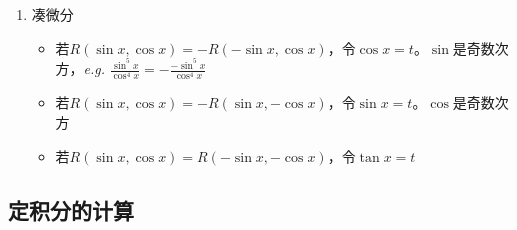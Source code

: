 \documentclass[../book.tex]{subfiles}
\begin{document}
\begin{enumerate}
\begin{enumerate}
\begin{analysisbox}
                又：
                \[
                    1+\cos x
                    =
                    2\cos^2\frac{x}{2}
                \]

                所以：
                \[
                    I
                    =
                    \frac1{2a}
                    \int\sec^2\frac{x}{2}\,\mathrm{d}x
                \]

                得：
                \[
                    I
                    =
                    \frac1a\tan\frac{x}{2}+C
                \]

                若：
                \[
                    a=-b
                \]

                则：
                \[
                    a+b\cos x
                    =
                    a(1-\cos x)
                \]

                又：
                \[
                    1-\cos x
                    =
                    2\sin^2\frac{x}{2}
                \]

                所以：
                \[
                    I
                    =
                    \frac1{2a}
                    \int\csc^2\frac{x}{2}\,\mathrm{d}x
                \]

                得：
                \[
                    I
                    =
                    -\frac1a\cot\frac{x}{2}+C
                \]
            \end{analysisbox}
            \item 凑微分
            \begin{itemize}
                \item 若$R(\sin x, \cos x) = -R(-\sin x, \cos x)$，令$\cos x = t$。$\sin$是奇数次方，\emph{e.g.} $\displaystyle\frac{\sin^5 x}{\cos^4 x} = -\displaystyle\frac{-\sin^5 x}{\cos^4 x}$
                \item 若$R(\sin x, \cos x) = -R(\sin x, -\cos x)$，令$\sin x = t$。$\cos$是奇数次方
                \item 若$R(\sin x, \cos x) = R(-\sin x, -\cos x)$，令$\tan x = t$
            \end{itemize}
        \end{enumerate}
    \end{enumerate}

    \subsection{定积分的计算}
\end{document}
